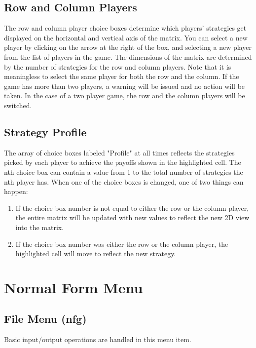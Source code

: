 \documentclass[12pt]{report}
\begin{document}
\subsection{Row and Column Players} The row and column player choice boxes
determine which players' strategies get displayed on the horizontal and
vertical axis of the matrix.  You can select a new player by clicking on the 
arrow at the right of the box, and selecting a new player from the 
list of players in the game.  The dimensions of the matrix are
determined by the number of strategies for the row and column players.
Note that it is meaningless to select the same player for both the row and
the column.  If the game has more than two players, a warning will be
issued and no action will be taken.  In the case of a two player game, the
row and the column players will be switched.

\subsection{Strategy Profile}
The array of choice boxes labeled "Profile" at all times reflects the
strategies picked by each player to achieve the payoffs shown in the
highlighted cell.  The nth choice box can contain a value from 1 to the
total number of strategies the nth player has.  When one of the choice
boxes is changed, one of two things can happen:

\begin{enumerate}
\item If the choice box number is not equal to either the row or
the column player, the entire matrix will be updated with new values to
reflect the new 2D view into the matrix.
\item If the choice box number was either the row or the column player,
the highlighted cell will move to reflect the new strategy.
\end{enumerate}

\section{Normal Form Menu}

\subsection{File Menu (nfg)}\label{nffile}

Basic input/output operations are handled in this menu item.  
\end{document}
